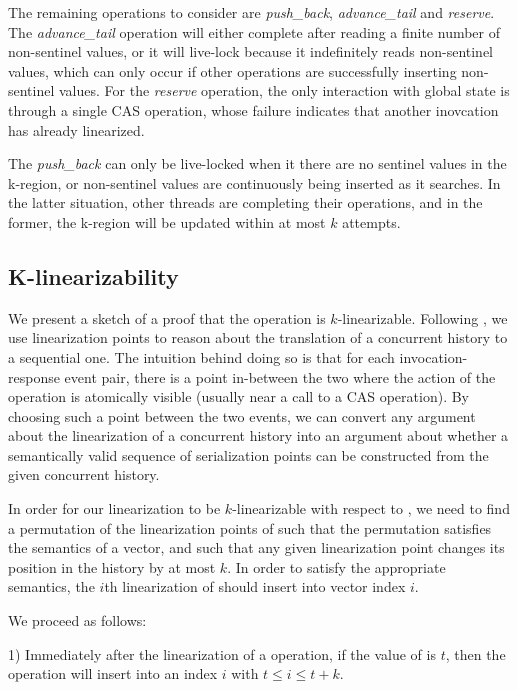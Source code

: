 \documentclass{sigplanconf}
\begin{document}
The remaining operations to consider are \emph{push\_back}, \emph{advance\_tail} and \emph{reserve}.
The \emph{advance\_tail} operation will either complete after reading a finite number of non-sentinel values, or it will live-lock because it indefinitely reads non-sentinel values, which can only occur if other operations are successfully inserting non-sentinel values. For the \emph{reserve} operation, the only interaction with global state is through a single CAS operation, whose failure indicates that another inovcation has already linearized.

The \emph{push\_back} can only be live-locked when it there are no sentinel values in the k-region, or non-sentinel values are continuously being inserted as it searches. In the latter situation, other threads are completing their operations, and in the former, the k-region will be updated within at most $k$ attempts.

\subsection{K-linearizability}

We present a sketch of a proof that the  operation is $k$-linearizable. Following \citet{dechev06}, we use linearization points to reason about the translation of a concurrent history to a sequential one. The intuition behind doing so is that for each invocation-response event pair, there is a point in-between the two where the action of the operation is atomically visible (usually near a call to a CAS operation). By choosing such a point between the two events, we can convert any argument about the linearization of a concurrent history into an argument about whether a semantically valid sequence of serialization points can be constructed from the given concurrent history.

In order for our linearization to be $k$-linearizable with respect to , we need to find a permutation of the linearization points of  such that the permutation satisfies the semantics of a vector, and such that any given linearization point changes its position in the history by at most $k$. In order to satisfy the appropriate semantics, the $i$th linearization of  should insert into vector index $i$.

We proceed as follows:

1) Immediately after the linearization of a  operation, if the value of  is $t$, then the operation will insert into an index $i$ with $t \le i \le t + k$. 
\end{document}

